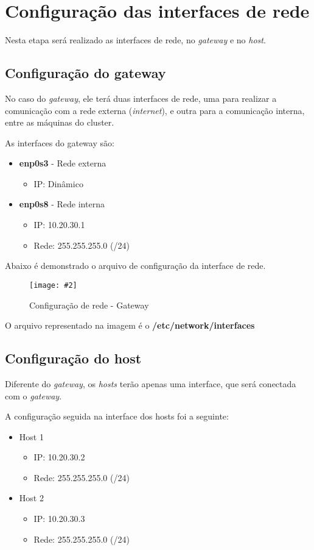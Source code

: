\documentclass[
	12pt,				%
	openany,			%
	a4paper,			%
	chapter=TITLE,		%
	section=TITLE,		%
	english,
	brazil				%
]{abntex2}
\newcommand{\includeImage}[3] {

\begin{figure}[H]
 	 \centering
  		\texttt{[image: \#2]}
  	\caption{#3}
\end{figure}

}
\begin{document}
\section{Configuração das interfaces de rede}

Nesta etapa será realizado as interfaces de rede, no \textit{gateway} e no \textit{host}.

\subsection{Configuração do gateway}

No caso do \textit{gateway}, ele terá duas interfaces de rede, uma para realizar a comunicação com a rede externa (\textit{internet}), e outra para a comunicação interna, entre as máquinas do cluster.

As interfaces do gateway são:
\begin{itemize}
	\item \textbf{enp0s3} - Rede externa
		\begin{itemize}
			\item IP: Dinâmico
		\end{itemize}
	\item \textbf{enp0s8} - Rede interna
		\begin{itemize}
			\item IP: 10.20.30.1
			\item Rede: 255.255.255.0 (/24)
		\end{itemize}
\end{itemize}

Abaixo é demonstrado o arquivo de configuração da interface de rede.

\includeImage{0.5}{imgs/2_configuracao_rede/gateway/1.png}{Configuração de rede - Gateway}

O arquivo representado na imagem é o \textbf{/etc/network/interfaces}

\subsection{Configuração do host}

Diferente do \textit{gateway}, os \textit{hosts} terão apenas uma interface, que será conectada com o \textit{gateway}.

A configuração seguida na interface dos hosts foi a seguinte:
\begin{itemize}
	\item Host 1
		\begin{itemize}
			\item IP: 10.20.30.2
			\item Rede: 255.255.255.0 (/24)
		\end{itemize}
	\item Host 2
		\begin{itemize}
			\item IP: 10.20.30.3
			\item Rede: 255.255.255.0 (/24)
		\end{itemize}
\end{itemize}
\end{document}
